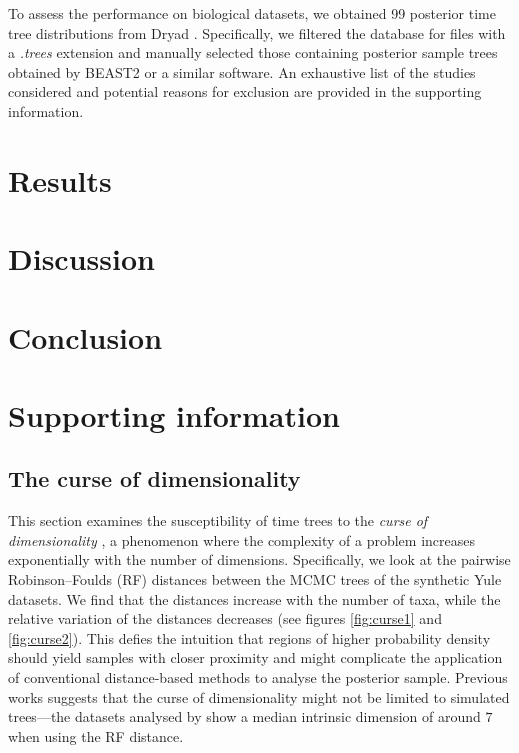 \documentclass[10pt,letterpaper]{article}
\begin{document}
To assess the performance on biological datasets, we obtained 99 posterior time tree distributions from Dryad \cite{dryad}. Specifically, we filtered the database for files with a \emph{.trees} extension and manually selected those containing posterior sample trees obtained by BEAST2 or a similar software. An exhaustive list of the studies considered and potential reasons for exclusion are provided in the supporting information.

\section*{Results}

\section*{Discussion}

\section*{Conclusion}

\section*{Supporting information}

\subsection*{The curse of dimensionality}

This section examines the susceptibility of time trees to the \emph{curse of dimensionality} \cite{curse}, a phenomenon where the complexity of a problem increases exponentially with the number of dimensions. Specifically, we look at the pairwise Robinson–Foulds (RF) distances between the MCMC trees of the synthetic Yule datasets. We find that the distances increase with the number of taxa, while the relative variation of the distances decreases (see figures \ref{fig:curse1} and \ref{fig:curse2}). This defies the intuition that regions of higher probability density should yield samples with closer proximity and might complicate the application of conventional distance-based methods to analyse the posterior sample. Previous works suggests that the curse of dimensionality might not be limited to simulated trees---the datasets analysed by \cite{dimensionality} show a median intrinsic dimension of around $7$ when using the RF distance.
\end{document}
